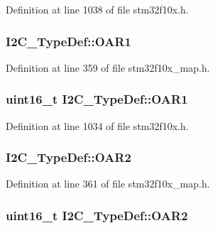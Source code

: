 Definition at line 1038 of file stm32f10x.\+h.

\subsubsection[{\texorpdfstring{O\+A\+R1}{OAR1}}]{ I2\+C\+\_\+\+Type\+Def\+::\+O\+A\+R1}\hypertarget{struct_i2_c___type_def_ae416e4379e1eca4977ae136c30c22560}{}\label{struct_i2_c___type_def_ae416e4379e1eca4977ae136c30c22560}


Definition at line 359 of file stm32f10x\+\_\+map.\+h.

\subsubsection[{\texorpdfstring{O\+A\+R1}{OAR1}}]{ {\bf uint16\+\_\+t} I2\+C\+\_\+\+Type\+Def\+::\+O\+A\+R1}\hypertarget{struct_i2_c___type_def_ad218fdcb9606477c1d63f8ee38d3c5c9}{}\label{struct_i2_c___type_def_ad218fdcb9606477c1d63f8ee38d3c5c9}


Definition at line 1034 of file stm32f10x.\+h.

\subsubsection[{\texorpdfstring{O\+A\+R2}{OAR2}}]{ I2\+C\+\_\+\+Type\+Def\+::\+O\+A\+R2}\hypertarget{struct_i2_c___type_def_a69d85dedb2cf53a4db41153d8534524c}{}\label{struct_i2_c___type_def_a69d85dedb2cf53a4db41153d8534524c}


Definition at line 361 of file stm32f10x\+\_\+map.\+h.

\subsubsection[{\texorpdfstring{O\+A\+R2}{OAR2}}]{ {\bf uint16\+\_\+t} I2\+C\+\_\+\+Type\+Def\+::\+O\+A\+R2}\hypertarget{struct_i2_c___type_def_a03189e2a57c81ae5d103739b72f52c93}{}\label{struct_i2_c___type_def_a03189e2a57c81ae5d103739b72f52c93}


